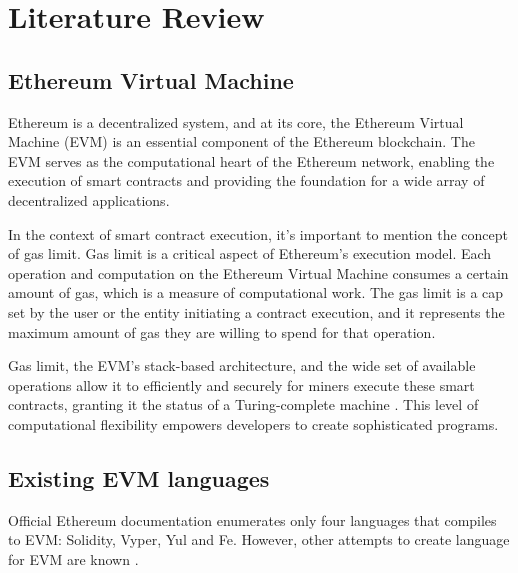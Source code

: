 \chapter{Literature Review}
\label{chap:lr}


\section{Ethereum Virtual Machine}
Ethereum is a decentralized system, and at its core, the Ethereum Virtual Machine (EVM) is an essential component of the Ethereum blockchain. The EVM serves as the computational heart of the Ethereum network, enabling the execution of smart contracts and providing the foundation for a wide array of decentralized applications.

In the context of smart contract execution, it's important to mention the concept of gas limit. Gas limit is a critical aspect of Ethereum's execution model. Each operation and computation on the Ethereum Virtual Machine consumes a certain amount of gas, which is a measure of computational work. The gas limit is a cap set by the user or the entity initiating a contract execution, and it represents the maximum amount of gas they are willing to spend for that operation.

Gas limit, the EVM's stack-based architecture, and the wide set of available operations allow it to efficiently and securely for miners execute these smart contracts, granting it the status of a Turing-complete machine \cite{EthereumWhitepaper}. This level of computational flexibility empowers developers to create sophisticated programs.

\section{Existing EVM languages}
Official Ethereum documentation \cite{OfficialEthereumLanguages} enumerates only four languages that compiles to EVM: Solidity, Vyper, Yul and Fe. However, other attempts to create language for EVM are known \cite{CommunityEthereumLanguages}.


